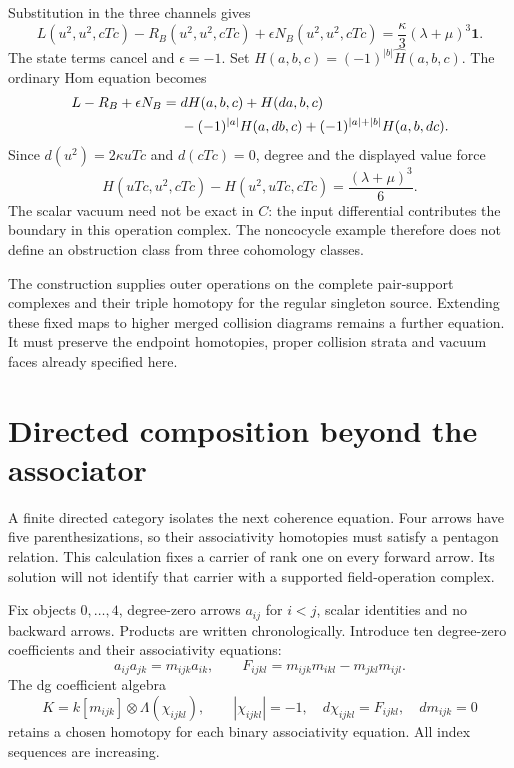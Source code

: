 Substitution in the three channels gives
\[
 L(u^2,u^2,cTc)-R_B(u^2,u^2,cTc)
                   +\epsilon N_B(u^2,u^2,cTc)
                  =\frac\kappa3(\lambda+\mu)^3\mathbf1.
\]
The state terms cancel and $\epsilon=-1$.
Set $H(a,b,c)=(-1)^{|b|}\widehat H(a,b,c)$.
The ordinary Hom equation becomes
\begin{align}\label{eq:vol2-state-jacobi-homotopy}
 L-R_B+\epsilon N_B={}&dH(a,b,c)+H(da,b,c)\notag\\
 &-(-1)^{|a|}H(a,db,c)
             +(-1)^{|a|+|b|}H(a,b,dc).
\end{align}
Since $d(u^2)=2\kappa uTc$ and $d(cTc)=0$, degree and
the displayed value force
\[
 H(uTc,u^2,cTc)-H(u^2,uTc,cTc)=\frac{(\lambda+\mu)^3}{6}.
\]
The scalar vacuum need not be exact in $C$: the input
differential contributes the boundary in this operation
complex. The noncocycle example therefore does not define
an obstruction class from three cohomology classes.

The construction supplies outer operations on the complete
pair-support complexes and their triple homotopy for the
regular singleton source. Extending these fixed maps to
higher merged collision diagrams remains a further equation.
It must preserve the endpoint homotopies, proper collision
strata and vacuum faces already specified here.

\section{Directed composition beyond the associator}
\label{sec:vol2-directed-higher-composition}

A finite directed category isolates the next coherence
equation. Four arrows have five parenthesizations, so their
associativity homotopies must satisfy a pentagon relation.
This calculation fixes a carrier of rank one on every forward
arrow. Its solution will not identify that carrier with a
supported field-operation complex.

Fix objects $0,\ldots,4$, degree-zero arrows $a_{ij}$ for
$i<j$, scalar identities and no backward arrows. Products
are written chronologically. Introduce ten degree-zero
coefficients and their associativity equations:
\[
 a_{ij}a_{jk}=m_{ijk}a_{ik},\qquad
 F_{ijkl}=m_{ijk}m_{ikl}-m_{jkl}m_{ijl}.
\]
The dg coefficient algebra
\[
 K=k[m_{ijk}]\otimes\Lambda(\chi_{ijkl}),\qquad
 |\chi_{ijkl}|=-1,\quad d\chi_{ijkl}=F_{ijkl},\quad dm_{ijk}=0
\]
retains a chosen homotopy for each binary associativity
equation. All index sequences are increasing.

